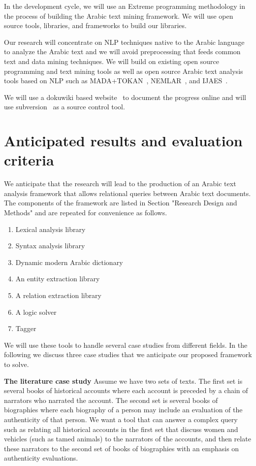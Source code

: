 \documentclass[12pt]{article}
\begin{document}
In the development cycle, we will use an Extreme programming methodology in the process of building the Arabic text mining framework.
 We will use open source tools, libraries, and frameworks to build our libraries.
 
Our research will concentrate on NLP techniques native to the Arabic language to analyze the Arabic text and we will avoid preprocessing that feeds common text and data mining techniques.
 We will build on existing open source programming and text mining tools as well as open source Arabic text analysis tools based on NLP such as MADA+TOKAN~\cite{Rot08}, NEMLAR~\cite{RAl09}, and IJAES~\cite{Int09}.

We will use a dokuwiki based website~\cite{Dok09} to document the progress online and will use subversion~\cite{Sub09} as a source control tool.




\section{Anticipated results and evaluation criteria}
\label{s:results}


We anticipate that the research will lead to the production of an Arabic text analysis framework that allows relational queries between Arabic text documents.
 The components of the framework are listed in Section "Research Design and Methods" and are repeated for convenience as follows.
 \begin{enumerate}
 \item Lexical analysis library 
 \item Syntax analysis library
\item Dynamic modern Arabic dictionary
\item An entity extraction library
\item A relation extraction library
\item A logic solver 
\item Tagger
\end{enumerate}

We will use these tools to handle several case studies from different fields.
 In the following we discuss three case studies that we anticipate our proposed framework to solve.
 
{\bf The literature case study}
Assume we have two sets of texts.
 The first set is several books of historical accounts where each account is preceded by a chain of narrators who narrated the account.
 The second set is several books of biographies where each biography of a person may include an evaluation of the authenticity of that person.
 We want a tool that can answer a complex query such as relating all historical accounts in the first set that discuss women and vehicles (such as tamed animals) to the narrators of the accounts, and then relate these narrators to the second set of books of biographies with an emphasis on authenticity evaluations.
\end{document}

